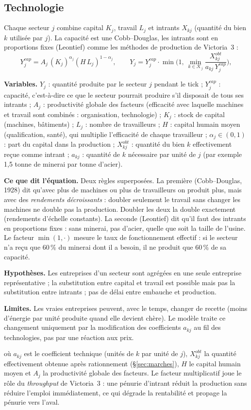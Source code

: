 \documentclass[11pt,a4paper]{article}
\newcommand{\variables}{\par\noindent\textbf{Variables.} }
\newcommand{\sens}{\par\noindent\textbf{Ce que dit l'équation.} }
\newcommand{\hyp}{\par\noindent\textbf{Hypothèses.} }
\newcommand{\limites}{\par\noindent\textbf{Limites.} }
\begin{document}
\subsection{Technologie}
Chaque secteur $j$ combine capital $K_j$, travail $L_j$ et intrants $X_{kj}$ (quantité du bien $k$ utilisée par $j$). La capacité est une Cobb--Douglas, les intrants sont en proportions fixes (Leontief) comme les méthodes de production de Victoria~3 :
\begin{equation}
Y_j^{cap} = A_j\, (K_j)^{\alpha_j} (H\, L_j)^{1-\alpha_j}, \qquad
Y_j = Y_j^{cap} \cdot \min\!\Big(1,\ \min_{k \in \mathcal{K}_j} \frac{X_{kj}^{obt}}{a_{kj}\, Y_j^{cap}}\Big),
\label{eq:prod}
\end{equation}
\begin{lecture}
\variables $Y_j$ : quantité produite par le secteur $j$ pendant le tick ; $Y_j^{cap}$ : capacité, c'est-à-dire ce que le secteur pourrait produire s'il disposait de tous ses intrants ; $A_j$ : productivité globale des facteurs (efficacité avec laquelle machines et travail sont combinés : organisation, technologie) ; $K_j$ : stock de capital (machines, bâtiments) ; $L_j$ : nombre de travailleurs ; $H$ : capital humain moyen (qualification, santé), qui multiplie l'efficacité de chaque travailleur ; $\alpha_j\in(0,1)$ : part du capital dans la production ; $X^{obt}_{kj}$ : quantité du bien $k$ effectivement reçue comme intrant ; $a_{kj}$ : quantité de $k$ nécessaire par unité de $j$ (par exemple 1,5 tonne de minerai par tonne d'acier).
\sens Deux règles superposées. La première (Cobb--Douglas, 1928) dit qu'avec plus de machines ou plus de travailleurs on produit plus, mais avec des \emph{rendements décroissants} : doubler seulement le travail sans changer les machines ne double pas la production. Doubler les deux la double exactement (rendements d'échelle constants). La seconde (Leontief) dit qu'il faut des intrants en proportions fixes : sans minerai, pas d'acier, quelle que soit la taille de l'usine. Le facteur $\min(1,\cdot)$ mesure le taux de fonctionnement effectif : si le secteur n'a reçu que 60\,\% du minerai dont il a besoin, il ne produit que 60\,\% de sa capacité.
\hyp Les entreprises d'un secteur sont agrégées en une seule entreprise représentative ; la substitution entre capital et travail est possible mais pas la substitution entre intrants ; pas de délai entre embauche et production.
\limites Les vraies entreprises peuvent, avec le temps, changer de recette (moins d'énergie par unité produite quand elle devient chère). Le modèle traite ce changement uniquement par la modification des coefficients $a_{kj}$ au fil des technologies, pas par une réaction aux prix.
\end{lecture}
où $a_{kj}$ est le coefficient technique (unités de $k$ par unité de $j$), $X^{obt}_{kj}$ la quantité effectivement obtenue après rationnement (\S\ref{sec:marches}), $H$ le capital humain moyen et $A_j$ la productivité globale des facteurs. Le facteur multiplicatif joue le rôle du \emph{throughput} de Victoria~3 : une pénurie d'intrant réduit la production sans réduire l'emploi immédiatement, ce qui dégrade la rentabilité et propage la pénurie vers l'aval.
\end{document}
